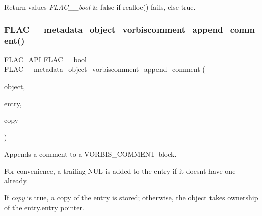 \begin{DoxyRetVals}{Return values}
{\em F\+L\+A\+C\+\_\+\+\_\+bool} & {\ttfamily false} if realloc() fails, else {\ttfamily true}. \\
\hline
\end{DoxyRetVals}
\mbox{\label{group__flac__metadata__object_gad04ef80ae5f852db8f3729a6ef8c1631}} 
\subsubsection{\texorpdfstring{FLAC\_\_metadata\_object\_vorbiscomment\_append\_comment()}{FLAC\_\_metadata\_object\_vorbiscomment\_append\_comment()}}
{\footnotesize\ttfamily \mbox{\hyperlink{group__flac__export_ga56ca07df8a23310707732b1c0007d6f5}{F\+L\+A\+C\+\_\+\+A\+PI}} \mbox{\hyperlink{ordinals_8h_a95103469f1cbd78b8cf250194985b34e}{F\+L\+A\+C\+\_\+\+\_\+bool}} F\+L\+A\+C\+\_\+\+\_\+metadata\+\_\+object\+\_\+vorbiscomment\+\_\+append\+\_\+comment (\begin{DoxyParamCaption}\item[{\mbox{\hyperlink{struct_f_l_a_c_____stream_metadata}{F\+L\+A\+C\+\_\+\+\_\+\+Stream\+Metadata}} $\ast$}]{object,  }\item[{\mbox{\hyperlink{struct_f_l_a_c_____stream_metadata___vorbis_comment___entry}{F\+L\+A\+C\+\_\+\+\_\+\+Stream\+Metadata\+\_\+\+Vorbis\+Comment\+\_\+\+Entry}}}]{entry,  }\item[{\mbox{\hyperlink{ordinals_8h_a95103469f1cbd78b8cf250194985b34e}{F\+L\+A\+C\+\_\+\+\_\+bool}}}]{copy }\end{DoxyParamCaption})}

Appends a comment to a V\+O\+R\+B\+I\+S\+\_\+\+C\+O\+M\+M\+E\+NT block.

For convenience, a trailing N\+UL is added to the entry if it doesn\textquotesingle{}t have one already.

If {\itshape copy} is {\ttfamily true}, a copy of the entry is stored; otherwise, the object takes ownership of the {\ttfamily entry.\+entry} pointer.

